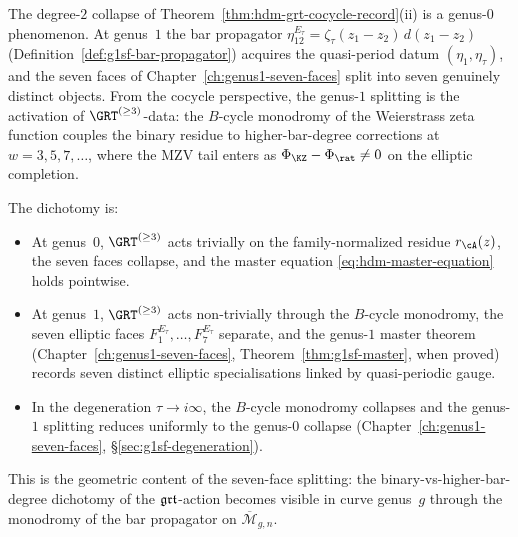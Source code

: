 \begin{remark}
\label{rem:hdm-grt-genus1-activation}
The degree-$2$ collapse of
Theorem~\ref{thm:hdm-grt-cocycle-record}(ii) is a genus-$0$
phenomenon. At genus~$1$ the bar propagator
$\eta_{12}^{E_\tau}=\zeta_\tau(z_1-z_2)\,d(z_1-z_2)$
\textup{(}Definition~\ref{def:g1sf-bar-propagator}\textup{)}
acquires the quasi-period datum
$(\eta_1,\eta_\tau)$, and the seven faces of
Chapter~\ref{ch:genus1-seven-faces} split into seven genuinely
distinct objects. From the cocycle perspective, the genus-$1$
splitting is the activation of $\GRT^{(\geq 3)}$-data: the $B$-cycle
monodromy of the Weierstrass zeta function couples the binary
residue to higher-bar-degree corrections at $w=3,5,7,\dots$, where
the MZV tail enters as $\Phi_{\KZ}-\Phi_{\rat}\not=0$ on the
elliptic completion.

The dichotomy is:
\begin{itemize}
\item At genus~$0$, $\GRT^{(\geq 3)}$ acts trivially on the
family-normalized residue $r_\cA(z)$, the
seven faces collapse, and the master equation
\eqref{eq:hdm-master-equation} holds pointwise.
\item At genus~$1$, $\GRT^{(\geq 3)}$ acts non-trivially through
the $B$-cycle monodromy, the seven elliptic faces $F_1^{E_\tau},
\dots,F_7^{E_\tau}$ separate, and the genus-$1$ master theorem
\textup{(}Chapter~\ref{ch:genus1-seven-faces},
Theorem~\textup{\ref{thm:g1sf-master}}, when proved\textup{)}
records seven distinct elliptic specialisations linked by
quasi-periodic gauge.
\item In the degeneration $\tau\to i\infty$, the $B$-cycle
monodromy collapses and the genus-$1$ splitting reduces uniformly
to the genus-$0$ collapse \textup{(}Chapter~\ref{ch:genus1-seven-faces},
\S\textup{\ref{sec:g1sf-degeneration}}\textup{)}.
\end{itemize}
This is the geometric content of the seven-face splitting: the
binary-vs-higher-bar-degree dichotomy of the $\mathfrak{grt}$-action becomes
visible in curve genus~$g$ through the monodromy of the bar propagator
on $\overline{\mathcal{M}}_{g,n}$.
\end{remark}

